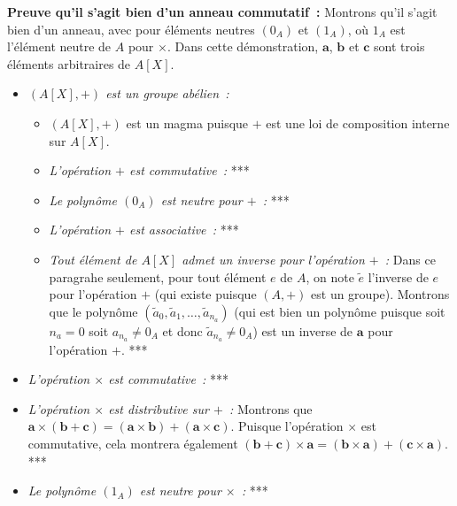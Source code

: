\noindent\textbf{Preuve qu'il s'agit bien d'un anneau commutatif :} Montrons qu'il s'agit bien d'un anneau, avec pour éléments neutres $(0_A)$ et $(1_A)$, où $1_A$ est l'élément neutre de $A$ pour $\times$. 
Dans cette démonstration, $\mathbf{a}$, $\mathbf{b}$ et $\mathbf{c}$ sont trois éléments arbitraires de $A[X]$.
\begin{itemize}[nosep]
    \item \textit{$(A[X], +)$ est un groupe abélien :}
        \begin{itemize}[nosep]
            \item $(A[X], +)$ est un magma puisque $+$ est une loi de composition interne sur $A[X]$.
            \item \textit{L'opération $+$ est commutative :} ***
            \item \textit{Le polynôme $(0_A)$ est neutre pour $+$ :} ***
            \item \textit{L'opération $+$ est associative :} ***
            \item \textit{Tout élément de $A[X]$ admet un inverse pour l'opération $+$ :}
                Dans ce paragrahe seulement, pour tout élément $e$ de $A$, on note $\tilde{e}$ l'inverse de $e$ pour l'opération $+$ (qui existe puisque $(A, +)$ est un groupe). 
                Montrons que le polynôme $(\tilde{a}_0, \tilde{a}_1, \dots, \tilde{a}_{n_a})$ (qui est bien un polynôme puisque soit $n_a = 0$ soit $a_{n_a} \neq 0_A$ et donc $\tilde{a}_{n_a} \neq 0_A$) est un inverse de $\mathbf{a}$ pour l'opération $+$.
                ***
        \end{itemize}
    \item \textit{L'opération $\times$ est commutative :}
        ***
    \item \textit{L'opération $\times$ est distributive sur $+$ :} 
        Montrons que $\mathbf{a} \times (\mathbf{b} + \mathbf{c}) = (\mathbf{a} \times \mathbf{b}) + (\mathbf{a} \times \mathbf{c})$.
        Puisque l'opération $\times$ est commutative, cela montrera également $(\mathbf{b} + \mathbf{c}) \times \mathbf{a} = (\mathbf{b} \times \mathbf{a}) + (\mathbf{c} \times \mathbf{a})$.
        ***
    \item \textit{Le polynôme $(1_A)$ est neutre pour $\times$ :}
        ***
\end{itemize}

